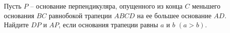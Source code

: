 \begin{ex}
	\begin{condition}
		Пусть \( P \) – основание перпендикуляра, опущенного из конца \( C  \) меньшего основания \( BC  \) равнобокой трапеции \( ABCD  \) на ее большее основание \( AD \). Найдите \( DP  \) и \( AP \),	если основания трапеции равны \( a  \) и \( b  \) \( (a > b)\).
	\end{condition}
\end{ex}